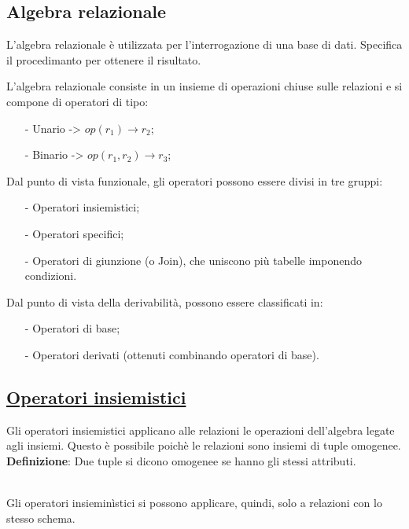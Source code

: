 \documentclass[a4paper, 10pt]{report}
\begin{document}
\begin{center}
\section*{Algebra relazionale}
\end{center}
L'algebra relazionale è utilizzata per l'interrogazione di una base di dati. Specifica il procedimanto per ottenere il risultato.

\noindent L'algebra relazionale consiste in un insieme di operazioni chiuse sulle relazioni e si compone di operatori di tipo:
\begin{itemize}
\item[-] Unario -> $op(r_1) \rightarrow r_2$;
\item[-] Binario -> $op(r_1, r_2) \rightarrow r_3$;
\end{itemize}

\noindent Dal punto di vista funzionale, gli operatori possono essere divisi in tre gruppi:
\begin{itemize}
\item[-] Operatori insiemistici;
\item[-] Operatori specifici;
\item[-] Operatori di giunzione (o Join), che uniscono più tabelle imponendo condizioni.
\end{itemize}

\noindent Dal punto di vista della derivabilità, possono essere classificati in:
\begin{itemize}
\item[-] Operatori di base;
\item[-] Operatori derivati (ottenuti combinando operatori di base).
\end{itemize}

\subsection*{\underline{Operatori insiemistici}}
Gli operatori insiemistici applicano alle relazioni le operazioni dell'algebra legate agli insiemi. Questo è possibile poichè le relazioni sono insiemi di tuple omogenee.\\

\noindent \textbf{Definizione}: Due tuple si dicono omogenee se hanno gli stessi attributi.\\\

\noindent Gli operatori insieminìstici si possono applicare, quindi, solo a relazioni con lo stesso schema.\\
\end{document}
